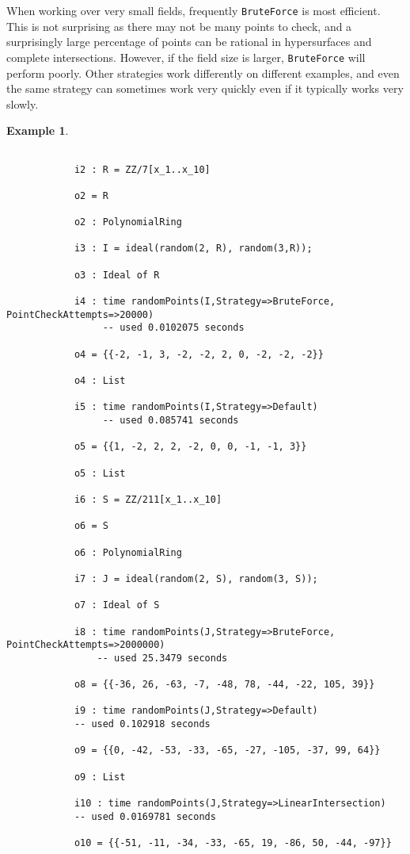 \documentclass[11pt]{amsart}
\theoremstyle{definition}
\newtheorem{example}{Example}[section]
\begin{document}
	When working over very small fields, frequently {\tt BruteForce} is most efficient.  This is not surprising as there may not be many points to check, and a surprisingly large percentage of points can be rational in hypersurfaces and complete intersections.  However, if the field size is larger, {\tt BruteForce} will perform poorly.  Other strategies work differently on different examples, and even the same strategy can sometimes work very quickly even if it typically works very slowly.
	\begin{example}
		{{\small\color{blue}
		\begin{verbatim}

			i2 : R = ZZ/7[x_1..x_10]

			o2 = R
			
			o2 : PolynomialRing
			
			i3 : I = ideal(random(2, R), random(3,R));
			
			o3 : Ideal of R
			
			i4 : time randomPoints(I,Strategy=>BruteForce, PointCheckAttempts=>20000)
				 -- used 0.0102075 seconds
			
			o4 = {{-2, -1, 3, -2, -2, 2, 0, -2, -2, -2}}
			
			o4 : List
			
			i5 : time randomPoints(I,Strategy=>Default)
				 -- used 0.085741 seconds
			
			o5 = {{1, -2, 2, 2, -2, 0, 0, -1, -1, 3}}
			
			o5 : List

			i6 : S = ZZ/211[x_1..x_10]

			o6 = S

			o6 : PolynomialRing

			i7 : J = ideal(random(2, S), random(3, S));

			o7 : Ideal of S

			i8 : time randomPoints(J,Strategy=>BruteForce, PointCheckAttempts=>2000000)
				-- used 25.3479 seconds

			o8 = {{-36, 26, -63, -7, -48, 78, -44, -22, 105, 39}}

			i9 : time randomPoints(J,Strategy=>Default)
			-- used 0.102918 seconds
	   
			o9 = {{0, -42, -53, -33, -65, -27, -105, -37, 99, 64}}
			
			o9 : List

			i10 : time randomPoints(J,Strategy=>LinearIntersection)
			-- used 0.0169781 seconds

			o10 = {{-51, -11, -34, -33, -65, 19, -86, 50, -44, -97}}


\end{verbatim}}}
\end{example}
\end{document}
